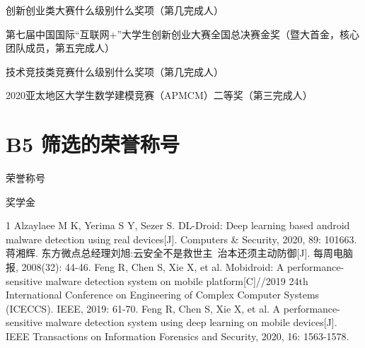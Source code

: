 \documentclass[14pt]{jnuthesis}
\begin{document}
\begin{enumerate}[{[}1{]}]
	\item 创新创业类大赛什么级别什么奖项（第几完成人） %
	\item 第七届中国国际“互联网+”大学生创新创业大赛全国总决赛金奖（暨大首金，核心团队成员，第五完成人）
	\item 技术竞技类竞赛什么级别什么奖项（第几完成人） %
	\item 2020亚太地区大学生数学建模竞赛（APMCM）二等奖（第三完成人）
\end{enumerate}

\section*{B5 筛选的荣誉称号}

\begin{enumerate}[{[}1{]}]
	\item 荣誉称号
	\item 奖学金
\end{enumerate}



\begin{thebibliography}{1}
 Alzaylaee M K, Yerima S Y, Sezer S. DL-Droid: Deep learning based android malware detection using real devices[J]. Computers \& Security, 2020, 89: 101663. %
 蒋湘辉. 东方微点总经理刘旭:云安全不是救世主\ 治本还须主动防御[J]. 每周电脑报, 2008(32): 44-46. %
 Feng R, Chen S, Xie X, et al. Mobidroid: A performance-sensitive malware detection system on mobile platform[C]//2019 24th International Conference on Engineering of Complex Computer Systems (ICECCS). IEEE, 2019: 61-70. 
 Feng R, Chen S, Xie X, et al. A performance-sensitive malware detection system using deep learning on mobile devices[J]. IEEE Transactions on Information Forensics and Security, 2020, 16: 1563-1578. 
\end{thebibliography}
\end{document}

